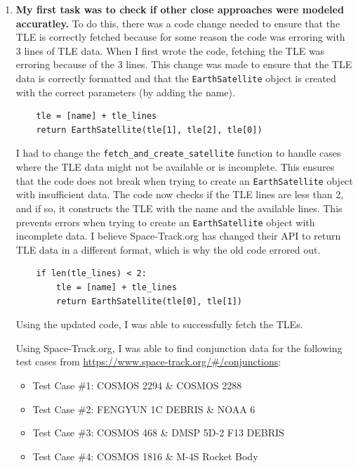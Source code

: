 \documentclass[12pt]{report}
\begin{document}
\begin{enumerate}
  
  \item \textbf{My first task was to check if other close approaches were modeled accuratley.}
  \newline
  To do this, there was a code change needed to ensure that the TLE is correctly fetched because for some reason the code was erroring with 3 lines of TLE data.
  \newline\newline
  When I first wrote the code, fetching the TLE was erroring because of the 3 lines. This change was made to ensure that the TLE data is correctly formatted and that the \texttt{EarthSatellite} object is created with the correct parameters (by adding the name).
  \newline
  \begin{verbatim}
    tle = [name] + tle_lines
    return EarthSatellite(tle[1], tle[2], tle[0])
  \end{verbatim}

  I had to change the \texttt{fetch\_and\_create\_satellite} function to handle cases where the TLE data might not be available or is incomplete. This ensures that the code does not break when trying to create an \texttt{EarthSatellite} object with insufficient data.
  The code now checks if the TLE lines are less than 2, and if so, it constructs the TLE with the name and the available lines. This prevents errors when trying to create an \texttt{EarthSatellite} object with incomplete data.
  I believe Space-Track.org has changed their API to return TLE data in a different format, which is why the old code errored out.
  \newline
  \begin{verbatim}
    if len(tle_lines) < 2:
        tle = [name] + tle_lines
        return EarthSatellite(tle[0], tle[1])
  \end{verbatim}

  Using the updated code, I was able to successfully fetch the TLEs.

  \pagebreak
  Using Space-Track.org, I was able to find conjunction data for the following test cases from \url{https://www.space-track.org/#/conjunctions}:
  \begin{itemize}
    \item Test Case \#1: COSMOS 2294 \& COSMOS 2288
    \item Test Case \#2: FENGYUN 1C DEBRIS \& NOAA 6
    \item Test Case \#3: COSMOS 468 \& DMSP 5D-2 F13 DEBRIS
    \item Test Case \#4: COSMOS 1816 \& M-4S Rocket Body
  \end{itemize}


\end{enumerate}
\end{document}
